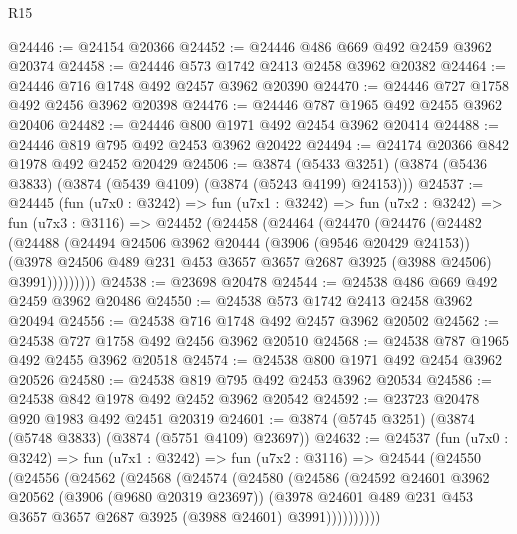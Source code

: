 \begin{lexlean}{R15}
\begin{coremodule}
@24446 := @24154 @20366
@24452 := @24446 @486 @669 @492 @2459 @3962 @20374
@24458 := @24446 @573 @1742 @2413 @2458 @3962 @20382
@24464 := @24446 @716 @1748 @492 @2457 @3962 @20390
@24470 := @24446 @727 @1758 @492 @2456 @3962 @20398
@24476 := @24446 @787 @1965 @492 @2455 @3962 @20406
@24482 := @24446 @800 @1971 @492 @2454 @3962 @20414
@24488 := @24446 @819 @795 @492 @2453 @3962 @20422
@24494 := @24174 @20366 @842 @1978 @492 @2452 @20429
@24506 := @3874
    (@5433 @3251)
    (@3874 (@5436 @3833) (@3874 (@5439 @4109) (@3874 (@5243 @4199) @24153)))
@24537 := @24445
    (fun (u7x0 : @3242) =>
    fun (u7x1 : @3242) =>
    fun (u7x2 : @3242) =>
    fun (u7x3 : @3116) =>
    @24452
      (@24458
        (@24464
          (@24470
            (@24476
              (@24482
                (@24488
                  (@24494
                    @24506
                    @3962
                    @20444
                    (@3906 (@9546 @20429 @24153))
                    (@3978
                      @24506
                      @489
                      @231
                      @453
                      @3657
                      @3657
                      @2687
                      @3925
                      (@3988 @24506)
                      @3991)))))))))
@24538 := @23698 @20478
@24544 := @24538 @486 @669 @492 @2459 @3962 @20486
@24550 := @24538 @573 @1742 @2413 @2458 @3962 @20494
@24556 := @24538 @716 @1748 @492 @2457 @3962 @20502
@24562 := @24538 @727 @1758 @492 @2456 @3962 @20510
@24568 := @24538 @787 @1965 @492 @2455 @3962 @20518
@24574 := @24538 @800 @1971 @492 @2454 @3962 @20526
@24580 := @24538 @819 @795 @492 @2453 @3962 @20534
@24586 := @24538 @842 @1978 @492 @2452 @3962 @20542
@24592 := @23723 @20478 @920 @1983 @492 @2451 @20319
@24601 := @3874 (@5745 @3251) (@3874 (@5748 @3833) (@3874 (@5751 @4109) @23697))
@24632 := @24537
    (fun (u7x0 : @3242) =>
    fun (u7x1 : @3242) =>
    fun (u7x2 : @3116) =>
    @24544
      (@24550
        (@24556
          (@24562
            (@24568
              (@24574
                (@24580
                  (@24586
                    (@24592
                      @24601
                      @3962
                      @20562
                      (@3906 (@9680 @20319 @23697))
                      (@3978
                        @24601
                        @489
                        @231
                        @453
                        @3657
                        @3657
                        @2687
                        @3925
                        (@3988 @24601)
                        @3991))))))))))

\end{coremodule}
\end{lexlean}
